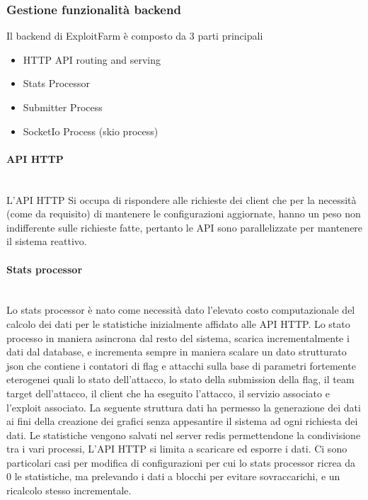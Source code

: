 \documentclass[11pt]{article}
\begin{document}
\subsubsection{Gestione funzionalità backend}
Il backend di ExploitFarm è composto da 3 parti principali
\begin{itemize}
	\item HTTP API routing and serving
	\item Stats Processor
	\item Submitter Process
	\item SocketIo Process (skio process)
\end{itemize}
\paragraph{API HTTP}\mbox{}\\

L'API HTTP Si occupa di rispondere alle richieste dei client che per la necessità (come da requisito) di mantenere le configurazioni aggiornate, hanno un peso non indifferente sulle richieste fatte, pertanto le API sono parallelizzate per mantenere il sistema reattivo.
\paragraph{Stats processor}\mbox{}\\
Lo stats processor è nato come necessità dato l'elevato costo computazionale del calcolo dei dati per le statistiche inizialmente affidato alle API HTTP. Lo stato processo in maniera asincrona dal resto del sistema, scarica incrementalmente i dati dal database, e incrementa sempre in maniera scalare un dato strutturato json che contiene i contatori di flag e attacchi sulla base di parametri fortemente eterogenei quali lo stato dell'attacco, lo stato della submission della flag, il team target dell'attacco, il client che ha eseguito l'attacco, il servizio associato e l'exploit associato. La seguente struttura dati ha permesso la generazione dei dati ai fini della creazione dei grafici senza appesantire il sistema ad ogni richiesta dei dati. Le statistiche vengono salvati nel server redis permettendone la condivisione tra i vari processi, L'API HTTP si limita a scaricare ed esporre i dati. Ci sono particolari casi per modifica di configurazioni per cui lo stats processor ricrea da 0 le statistiche, ma prelevando i dati a blocchi per evitare sovraccarichi, e un ricalcolo stesso incrementale.
\end{document}
